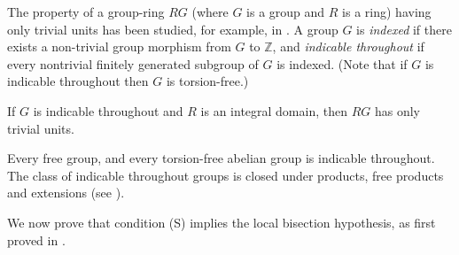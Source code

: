 The property of a group-ring $RG$ (where $G$ is a group and $R$ is a ring) having only trivial units has been studied, for example, in \cite{MR0002137}. A group $G$ is \emph{indexed} if there exists a non-trivial group morphism from $G$ to $\mathbb{Z}$, and \emph{indicable throughout} if every nontrivial finitely generated subgroup of $G$ is indexed. (Note that if $G$ is indicable throughout then $G$ is torsion-free.)

\begin{theorem}[{\cite[Theorem 13]{MR0002137}}]
If $G$ is indicable throughout and $R$ is an integral domain, then $RG$ has only trivial units.
\end{theorem}

Every free group, and every torsion-free abelian group is indicable throughout. The class of indicable throughout groups is closed under products, free products and extensions (see \cite{MR0002137}).

We now prove that condition (S) implies the local bisection hypothesis, as first proved in \cite[Lemma 3.5]{MR3848066}.

